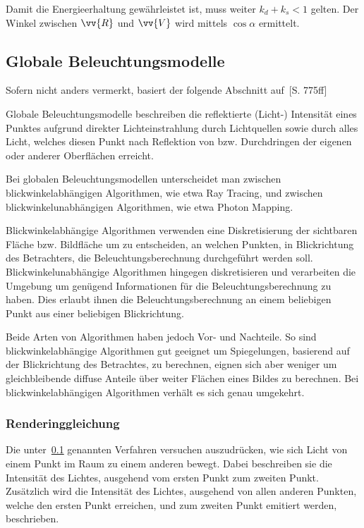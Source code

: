 Damit die Energieerhaltung gewährleistet ist, muss weiter $k_{d} + k_{s} < 1$
gelten. Der Winkel zwischen $\vv{R}$ und $\vv{V}$ wird mittels $\cos{\alpha}$
ermittelt.


\subsection{Globale Beleuchtungsmodelle}
\label{subsec:global_illumination_models}

Sofern nicht anders vermerkt, basiert der folgende Abschnitt auf~\cite{foley_computer_1996}[S. 775ff]

Globale Beleuchtungsmodelle beschreiben die reflektierte (Licht-) Intensität
eines Punktes aufgrund direkter Lichteinstrahlung durch Lichtquellen sowie
durch alles Licht, welches diesen Punkt nach Reflektion von bzw. Durchdringen
der eigenen oder anderer Oberflächen erreicht.

Bei globalen Beleuchtungsmodellen unterscheidet man zwischen
blickwinkelabhängigen Algorithmen, wie etwa Ray Tracing, und zwischen
blickwinkelunabhängigen Algorithmen, wie etwa Photon Mapping.

Blickwinkelabhängige Algorithmen verwenden eine Diskretisierung der sichtbaren
Fläche bzw. Bildfläche um zu entscheiden, an welchen Punkten, in Blickrichtung
des Betrachters, die Beleuchtungsberechnung durchgeführt werden soll.
Blickwinkelunabhängige Algorithmen hingegen diskretisieren und verarbeiten die
Umgebung um genügend Informationen für die Beleuchtungsberechnung zu haben.
Dies erlaubt ihnen die Beleuchtungsberechnung an einem beliebigen Punkt aus
einer beliebigen Blickrichtung.

Beide Arten von Algorithmen haben jedoch Vor- und Nachteile. So sind
blickwinkelabhängige Algorithmen gut geeignet um Spiegelungen, basierend auf
der Blickrichtung des Betrachtes, zu berechnen, eignen sich aber weniger um
gleichbleibende diffuse Anteile über weiter Flächen eines Bildes zu berechnen.
Bei blickwinkelabhängigen Algorithmen verhält es sich genau umgekehrt.

\subsubsection{Renderinggleichung}
\label{ssubsec:rendering_equation}

Die unter~\ref{subsec:global_illumination_models} genannten Verfahren versuchen
auszudrücken, wie sich Licht von einem Punkt im Raum zu einem anderen bewegt.
Dabei beschreiben sie die Intensität des Lichtes, ausgehend vom ersten Punkt
zum zweiten Punkt. Zusätzlich wird die Intensität des Lichtes, ausgehend von
allen anderen Punkten, welche den ersten Punkt erreichen, und zum zweiten Punkt
emitiert werden, beschrieben.

